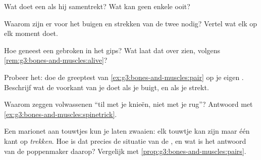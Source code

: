 \begin{exercise}[$\star$]\label{exo:g3:bones-and-muscles:5}
Wat doet een  als hij samentrekt? Wat kan geen enkele  ooit?
\end{exercise}

\begin{exercise}[$\star$]\label{exo:g3:bones-and-muscles:6}
Waarom zijn er voor het buigen en strekken van de  twee 
nodig? Vertel wat elk op elk moment doet.
\end{exercise}

\begin{exercise}[$\star$]\label{exo:g3:bones-and-muscles:7}
Hoe geneest een gebroken  in het gips? Wat laat dat over  zien,
volgens \cref{rem:g3:bones-and-muscles:alive}?
\end{exercise}

\begin{exercise}[$\star$]\label{exo:g3:bones-and-muscles:8}
Probeer het: doe de greeptest van \cref{ex:g3:bones-and-muscles:pair}
op je eigen . Beschrijf wat de voorkant van je  doet als je
buigt, en als je strekt.
\end{exercise}

\begin{exercise}[$\star\star$]\label{exo:g3:bones-and-muscles:9}
Waarom zeggen volwassenen ``til met je knieën, niet met je rug''?
Antwoord met \cref{ex:g3:bones-and-muscles:spinetrick}.
\end{exercise}

\begin{exercise}[$\star\star$]\label{exo:g3:bones-and-muscles:10}
Een marionet aan touwtjes kun je laten zwaaien: elk touwtje kan zijn
 maar één kant op \emph{trekken}. Hoe is dat precies de situatie van
de , en wat is het antwoord van de poppenmaker daarop? Vergelijk
met \cref{prop:g3:bones-and-muscles:pairs}.
\end{exercise}
